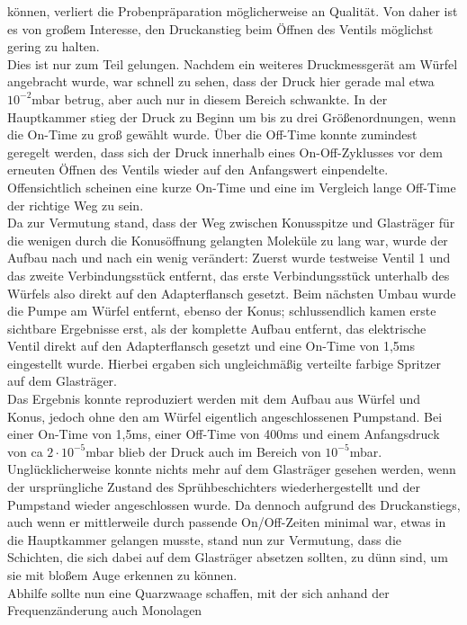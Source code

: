 können, verliert die Probenpräparation möglicherweise an Qualität. Von daher ist es von großem
Interesse, den Druckanstieg beim Öffnen des Ventils möglichst gering zu halten.\\
Dies ist nur zum Teil gelungen. Nachdem ein weiteres Druckmessgerät am Würfel angebracht wurde, war
schnell zu sehen, dass der Druck hier gerade mal etwa $10^{-2}$mbar betrug, aber auch nur in diesem
Bereich schwankte. In der Hauptkammer stieg der Druck zu Beginn um bis zu drei Größenordnungen, wenn
die On-Time zu groß gewählt wurde. Über die Off-Time konnte zumindest geregelt werden, dass sich der
Druck innerhalb eines On-Off-Zyklusses vor dem erneuten Öffnen des Ventils wieder auf den
Anfangswert einpendelte. Offensichtlich scheinen eine kurze On-Time und eine im Vergleich lange
Off-Time der richtige Weg zu sein.\\
Da zur Vermutung stand, dass der Weg zwischen Konusspitze und Glasträger für die wenigen durch die
Konusöffnung gelangten Moleküle zu lang war, wurde der Aufbau nach und nach ein wenig verändert:
Zuerst wurde testweise Ventil 1 und das zweite Verbindungsstück entfernt, das erste Verbindungsstück
unterhalb des Würfels also direkt auf den Adapterflansch gesetzt. Beim nächsten Umbau wurde die
Pumpe am Würfel entfernt, ebenso der Konus; schlussendlich kamen erste sichtbare Ergebnisse erst,
als der komplette Aufbau entfernt, das elektrische Ventil direkt auf den
Adapterflansch gesetzt und eine On-Time von 1,5ms eingestellt wurde. Hierbei ergaben sich
ungleichmäßig verteilte farbige Spritzer auf dem Glasträger.\\
Das Ergebnis konnte reproduziert werden mit dem Aufbau aus Würfel und Konus, jedoch ohne den am
Würfel eigentlich angeschlossenen Pumpstand. Bei einer On-Time von 1,5ms, einer Off-Time von
400ms und einem Anfangsdruck von ca $2\cdot10^{-5}$mbar blieb der Druck auch im Bereich von
$10^{-5}$mbar.\\
Unglücklicherweise konnte nichts mehr auf dem Glasträger gesehen werden, wenn der ursprüngliche
Zustand des Sprühbeschichters wiederhergestellt und der Pumpstand wieder angeschlossen wurde. Da
dennoch aufgrund des Druckanstiegs, auch wenn er mittlerweile durch passende On/Off-Zeiten minimal
war, etwas in die Hauptkammer gelangen musste, stand nun zur Vermutung, dass die Schichten, die
sich dabei auf dem Glasträger absetzen sollten, zu dünn sind, um sie mit bloßem Auge
erkennen zu können.\\
Abhilfe sollte nun eine Quarzwaage schaffen, mit der sich anhand der Frequenzänderung auch Monolagen
